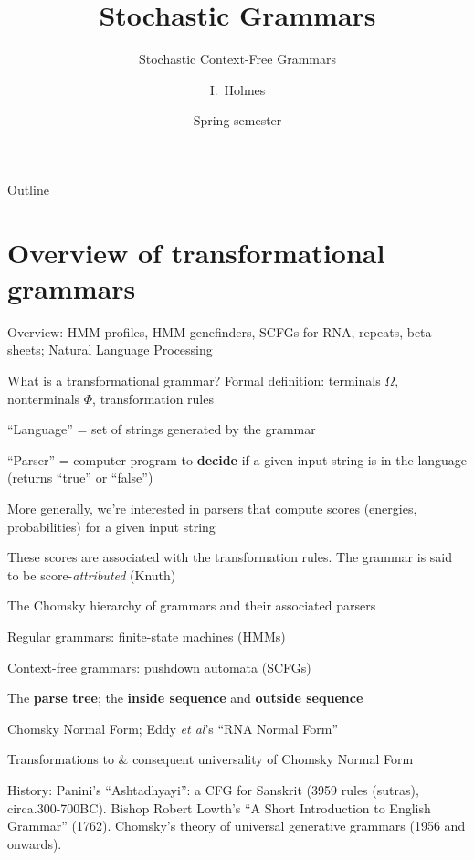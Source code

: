 \documentclass{beamer}
\title[SCFGs] %
{Stochastic Grammars}
\subtitle
{Stochastic Context-Free Grammars} %
\author%
{I.~Holmes} %
\institute[University of California, Berkeley] %
{
  Department of Bioengineering\\
  University of California, Berkeley}
\date%
{Spring semester}
\begin{document}
\begin{frame}
  \titlepage
\end{frame}

\begin{frame}{Outline}
  \tableofcontents
\end{frame}



\section{Overview of transformational grammars}

\begin{frame}{}

\itemb
\item Overview: HMM profiles, HMM genefinders, SCFGs for RNA, repeats, beta-sheets; Natural Language Processing
\item What is a transformational grammar? Formal definition: terminals $\Omega$, nonterminals $\Phi$, transformation rules
 \itemb
 \item ``Language'' = set of strings generated by the grammar
 \item ``Parser'' = computer program to {\bf decide} if a given input string is in the language (returns ``true'' or ``false'')
 \item More generally, we're interested in parsers that compute scores (energies, probabilities) for a given input string
 \item These scores are associated with the transformation rules. The grammar is said to be score-{\em attributed} (Knuth)
 \iteme
\item The Chomsky hierarchy of grammars and their associated parsers
 \itemb
 \item Regular grammars: finite-state machines (HMMs)
 \item Context-free grammars: pushdown automata (SCFGs)
  \itemb
  \item The {\bf parse tree}; the {\bf inside sequence} and {\bf outside sequence}
  \item Chomsky Normal Form; Eddy {\em et al}'s ``RNA Normal Form''
  \item Transformations to \& consequent universality of Chomsky Normal Form
  \item History:
Panini's ``Ashtadhyayi'': a CFG for Sanskrit (3959 rules (sutras), circa.300-700BC).
Bishop Robert Lowth's ``A Short Introduction to English Grammar'' (1762).
Chomsky's theory of universal generative grammars (1956 and onwards).

\end{frame}
\end{document}
